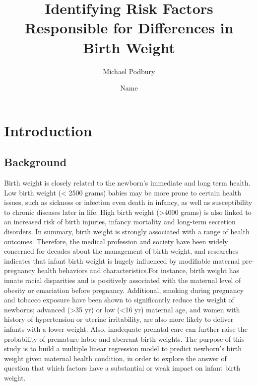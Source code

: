 \documentclass[9pt,twocolumn,twoside,]{pnas-new}
\title{Identifying Risk Factors Responsible for Differences in Birth
Weight}
\author[a]{Michael Podbury}
\author[a]{Name}
\affil[a]{The University of Sydney, NSW, 2008}
\begin{document}
\verticaladjustment{-2pt}

\maketitle
\thispagestyle{firststyle}


\acknow{}

\hypertarget{introduction}{%
\section*{Introduction}\label{introduction}}

\hypertarget{Background}{%
\subsection*{Background}\label{Background}}

Birth weight is closely related to the newborn's immediate and long term
health. Low birth weight (\textless{} 2500 grams) babies may be more
prone to certain health issues, such as sickness or infection even death
in infancy, as well as susceptibility to chronic diseases later in life.
High birth weight (\textgreater4000 grams) is also linked to an
increased risk of birth injuries, infancy mortality and long-term
secretion disorders. In summary, birth weight is strongly associated
with a range of health outcomes. Therefore, the medical profession and
society have been widely concerned for decades about the management of
birth weight, and researches indicates that infant birth weight is
hugely influenced by modifiable maternal pre-pregnancy health behaviors
and characteristics.For instance, birth weight has innate racial
disparities and is positively associated with the maternal level of
obesity or emaciation before pregnancy. Additional, smoking during
pregnancy and tobacco exposure have been shown to significantly reduce
the weight of newborns; advanced (\textgreater35 yr) or low (\textless16
yr) maternal age, and women with history of hypertension or uterine
irritability, are also more likely to deliver infants with a lower
weight. Also, inadequate prenatal care can further raise the probability
of premature labor and aberrant birth weights. The purpose of this study
is to build a multiple linear regression model to predict newborn's
birth weight given maternal health condition, in order to explore the
answer of question that which factors have a substantial or weak impact
on infant birth weight.
\end{document}
